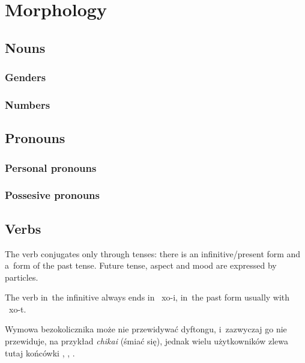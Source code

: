 \chapter{Morphology}
\label{ch:morphology}

\section{Nouns}
\subsection{Genders}
\subsection{Numbers}

\section{Pronouns}



\subsection{Personal pronouns}
\subsection{Possesive pronouns}

\section{Verbs}

The verb conjugates only through tenses: there is an infinitive/present form and
a~form of the past tense. Future tense, aspect and mood are expressed by
particles.

The verb in~the infinitive always ends in ~xo{-i}, in~the past form
usually with ~xo{-t}.



Wymowa bezokolicznika może nie przewidywać dyftongu, i~zazwyczaj go nie
przewiduje, na przykład \emph{chikai}  (śmiać się), jednak wielu
użytkowników zlewa tutaj końcówki , , .

\skipline

